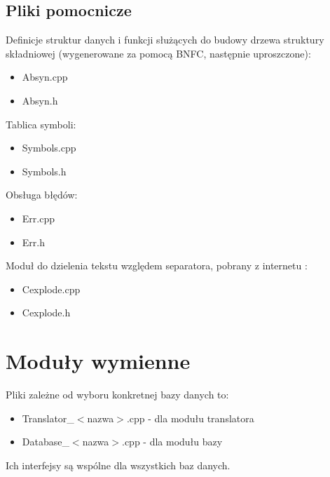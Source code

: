 \section{Pliki pomocnicze}
Definicje struktur danych i funkcji służących do budowy drzewa struktury składniowej (wygenerowane za pomocą BNFC, następnie uproszczone):
\begin{itemize}
 \item Absyn.cpp
\item Absyn.h
\end{itemize}
Tablica symboli:
\begin{itemize}
 \item Symbols.cpp
\item Symbols.h
\end{itemize}
Obsługa błędów:
\begin{itemize}
 \item Err.cpp
\item Err.h
\end{itemize}
Moduł do dzielenia tekstu względem separatora, pobrany z internetu \cite{cexplode}:
\begin{itemize}
 \item Cexplode.cpp
 \item Cexplode.h
\end{itemize}


\chapter{Moduły wymienne}
Pliki zależne od wyboru konkretnej bazy danych to:
\begin{itemize}
 \item Translator\_$<$nazwa$>$.cpp - dla modułu translatora
\item Database\_$<$nazwa$>$.cpp - dla modułu bazy
\end{itemize}
Ich interfejsy są wspólne dla wszystkich baz danych.
